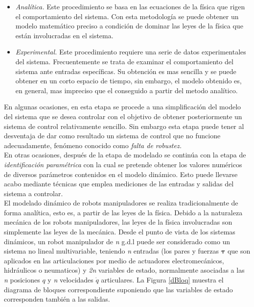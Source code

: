 \begin{itemize}
	\item \textit{Analítica.} Este procedimiento se basa en las ecuaciones de la física que rigen el comportamiento del sistema. Con esta metodología se puede obtener un modelo matemático preciso a condición de dominar las leyes de la física que están involucradas en el sistema.
	\item \textit{Experimental.} Este procedimiento requiere una serie de datos experimentales del sistema. Frecuentemente se trata de examinar el comportamiento del sistema ante entradas específicas. Su obtención es mas sencilla y se puede obtener en un corto espacio de tiempo, sin embargo, el modelo obtenido es, en general, mas impreciso que el conseguido a partir del metodo analítico. 
\end{itemize}

En algunas ocasiones, en esta etapa se procede a una simplificación del modelo del sistema que se desea controlar con el objetivo de obtener posteriormente un sistema de control relativamente sencillo. Sin embargo esta etapa puede tener al desventaja de dar como resultado un sistema de control que no funcione adecuadamente, fenómeno conocido como \textit{falta de robustez.}\\

En otras ocasiones, después de la etapa de modelado se continúa con la etapa de \textit{identificación paramétrica} con la cual se pretende obtener los valores numéricos de diversos parámetros contenidos en el modelo dinámico. Esto puede llevarse acabo mediante técnicas que emplea mediciones de las entradas y salidas del sistema a controlar.\\

El modelado dinámico de robots manipuladores se realiza tradicionalmente de forma analítica, esto es, a partir de las leyes de la física. Debido a la naturaleza mecánica de los robots manipuladores, las leyes de la física involucradas son simplemente las leyes de la mecánica. Desde el punto de vista de los sistemas dinámicos, un robot manipulador de \textit{n} g.d.l puede ser considerado como un sistema no lineal multivariable, teniendo \textit{n} entradas (los pares y fuerzas $\boldsymbol{\tau}$ que son aplicados en las articulaciones por medio de actuadores electromecánicos, hidráulicos o neumaticos) y \textit{2n} variables de estado, normalmente asociadas a las \textit{n} posiciones $\boldsymbol{\mathit{q}}$ y \textit{n} velocidades $\boldsymbol{\mathit{\dot{q}}}$ articulares. La Figura \ref{dBloq} muestra el diagrama de bloques correspondiente suponiendo que las variables de estado corresponden también a las salidas. \\

